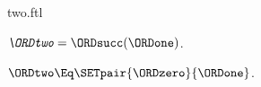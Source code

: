 \documentclass{stex}
\begin{document}
\begin{smodule}{two.ftl}

\begin{definition}[forthel]
  $\emph{\ORDtwo} = \ORDsucc(\ORDone)$.
\end{definition}

\begin{proposition}[forthel]
  $\ORDtwo \Eq \SETpair{\ORDzero}{\ORDone}$.
\end{proposition}
\end{smodule}
\end{document}
